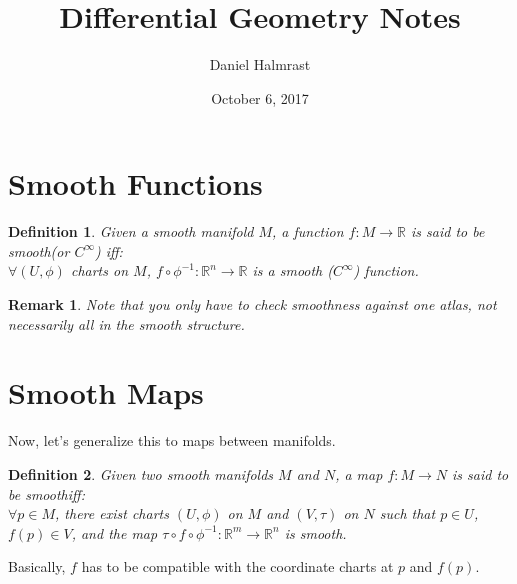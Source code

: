 \documentclass{article}
\author{Daniel Halmrast}
\title{Differential Geometry Notes}
\date{October 6, 2017}
\newtheorem*{definition}{Definition}
\newtheorem*{rmk}{Remark}
\begin{document}
\maketitle

\section*{Smooth Functions}

\begin{definition}
Given a smooth manifold $M$, a function $f:M\to\mathbb{R}$ is
said to be \em smooth\em (or $C^{\infty}$) iff:\\
$\forall (U,\phi)$ charts on $M$, $f\circ\phi^{-1}:\mathbb{R}^n\to\mathbb{R}$
is a smooth ($C^{\infty}$) function.
\end{definition}

\begin{rmk}
Note that you only have to check smoothness against one atlas,
not necessarily all in the smooth structure.
\end{rmk}

\section*{Smooth Maps}
Now, let's generalize this to maps between manifolds.

\begin{definition}
Given two smooth manifolds $M$ and $N$, a map $f:M\to N$ is
said to be \em smooth\em iff:\\
$\forall p\in M$, there exist charts $(U,\phi)$ on $M$ 
and $(V,\tau)$ on $N$ such that $p\in U$, $f(p)\in V$,
and the map $\tau\circ f \circ \phi^{-1}:\mathbb{R}^m\to\mathbb{R}^n$
is smooth.
\end{definition}
Basically, $f$ has to be compatible with the coordinate charts at $p$ and $f(p)$.
\end{document}

